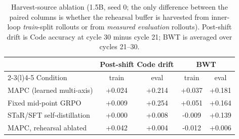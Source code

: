 \begin{table}[t]
\caption{Harvest-source ablation (1.5B, seed 0; the only difference
between the paired columns is whether the rehearsal buffer is harvested from
inner-loop \emph{train}-split rollouts or from \emph{measured evaluation} rollouts).
Post-shift drift is Code accuracy at cycle 30 minus cycle 21; BWT is averaged over
cycles 21--30.}
\label{tab:harvest}
\centering
\begin{tabular}{@{}lcccc@{}}
\toprule
 & \multicolumn{2}{c}{Post-shift Code drift} & \multicolumn{2}{c}{BWT} \\
\cmidrule(lr){2-3}\cmidrule(l){4-5}
Condition & train & eval & train & eval \\
\midrule
MAPC (learned multi-axis) & +0.024 & +0.214 & +0.037 & +0.181 \\
Fixed mid-point GRPO & +0.009 & +0.254 & +0.051 & +0.164 \\
STaR/SFT self-distillation & +0.000 & +0.008 & -0.009 & +0.139 \\
MAPC, rehearsal ablated & +0.042 & +0.004 & -0.012 & +0.006 \\
\bottomrule
\end{tabular}
\end{table}
